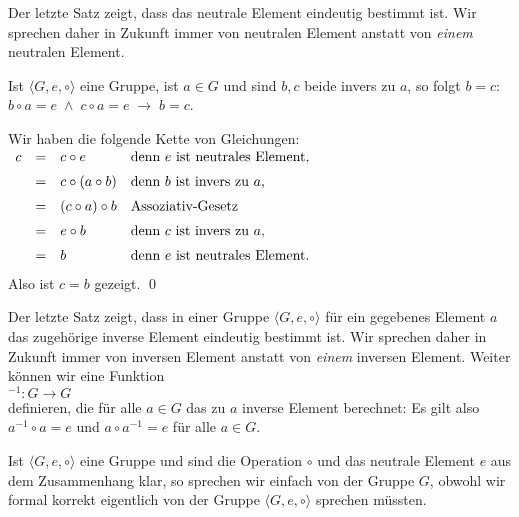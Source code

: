 \remark
Der letzte Satz zeigt, dass das neutrale Element eindeutig bestimmt ist.  Wir sprechen daher in Zukunft
immer von \underline{} neutralen Element anstatt von \emph{\color{blue}einem} neutralen Element.
\eoxs

\begin{Satz} \lb
  Ist $\langle G, e, \circ \rangle$ eine Gruppe, ist $a \in G$ und sind $b,c$ beide invers zu $a$, so folgt
  $b = c$:
  \\[0.2cm]
  \hspace*{1.3cm}
  $b \circ a = e \;\wedge\; c \circ a = e \;\rightarrow\; b = c$.
\end{Satz}

\proof
Wir haben die folgende Kette von Gleichungen:
\\[0.2cm]
\hspace*{1.3cm}
$
\begin{array}[t]{lcll}
  c & = & c \circ e & \mbox{denn $e$ ist neutrales Element,} \\[0.2cm]
    & = & c \circ (a \circ b) & \mbox{denn $b$ ist invers zu $a$,} \\[0.2cm]
    & = & (c \circ a) \circ b & \mbox{Assoziativ-Gesetz} \\[0.2cm]
    & = & e \circ b & \mbox{denn $c$ ist invers zu $a$,} \\[0.2cm]
    & = & b & \mbox{denn $e$ ist neutrales Element.} \\[0.2cm]
\end{array}
$
\\[0.2cm]
Also ist $c = b$ gezeigt. \qed


\remark Der letzte Satz zeigt, dass in einer Gruppe $\langle G, e, \circ \rangle$ f\"{u}r ein
gegebenes Element $a$ das zugeh\"{o}rige inverse Element eindeutig bestimmt ist. 
Wir sprechen daher in Zukunft
immer von \underline{} inversen Element anstatt von \emph{\color{blue}einem} inversen Element.
Weiter k\"{o}nnen wir eine Funktion
\\[0.2cm]
\hspace*{1.3cm} $^{-1}: G \rightarrow G$
\\[0.2cm]
definieren, die f\"{u}r alle $a \in G$ das zu $a$ inverse Element berechnet: Es gilt also
\\[0.2cm]
\hspace*{1.3cm} $a^{-1} \circ a = e$ \quad und \quad $a \circ a^{-1} = e$ \quad f\"{u}r alle $a \in G$.
\eoxs

\remark
Ist $\langle G, e, \circ \rangle$ eine Gruppe und sind die Operation $\circ$ und das neutrale Element 
$e$ aus dem Zusammenhang klar, so sprechen wir einfach von der Gruppe $G$, obwohl wir formal korrekt
eigentlich von der Gruppe $\langle G, e, \circ \rangle$ sprechen m\"{u}ssten. 
\eoxs

